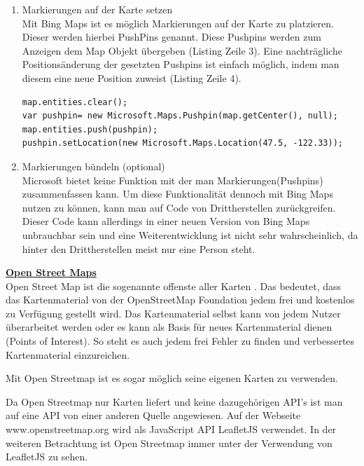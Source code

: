 \begin{enumerate}
\item Markierungen auf der Karte setzen\\

Mit Bing Maps ist es möglich Markierungen auf der Karte zu platzieren. Dieser werden hierbei PushPins genannt. Diese Pushpins werden zum Anzeigen dem Map Objekt übergeben (Listing Zeile 3). Eine nachträgliche Positionsänderung der gesetzten Pushpins ist einfach möglich, indem man diesem eine neue Position zuweist (Listing Zeile 4).

\begin{lstlisting}
map.entities.clear(); 
var pushpin= new Microsoft.Maps.Pushpin(map.getCenter(), null); 
map.entities.push(pushpin); 
pushpin.setLocation(new Microsoft.Maps.Location(47.5, -122.33)); 
\end{lstlisting}\cite[Pushpins7]{bingmaps}

\item Markierungen bündeln (optional)\\
Microsoft bietet keine Funktion mit der man Markierungen(Pushpins) zusammenfassen kann. Um diese Funktionalität dennoch mit Bing Maps nutzen zu können, kann man auf Code von Drittherstellen zurückgreifen. Dieser Code kann allerdings in einer neuen Version von Bing Maps unbrauchbar sein und eine Weiterentwicklung ist nicht sehr wahrscheinlich, da hinter den Drittherstellen meist nur eine Person steht. \cite[S. 92]{gruber2015}
\end{enumerate}








\textbf{\underline{Open Street Maps}}\\
Open Street Map ist die sogenannte \glqq offenste aller Karten \grqq \cite[S.92]{gruber2015}. Das bedeutet, dass das Kartenmaterial von der OpenStreetMap Foundation jedem frei und kostenlos zu Verfügung gestellt wird. Das Kartenmaterial selbst kann von jedem Nutzer überarbeitet werden oder es kann als Basis für neues Kartenmaterial dienen (Points of Interest). So steht es auch jedem frei Fehler zu finden und verbessertes Kartenmaterial einzureichen.

Mit Open Streetmap ist es sogar möglich seine eigenen Karten zu verwenden.

Da Open Streetmap nur Karten liefert und keine dazugehörigen API's ist man auf eine API von einer anderen Quelle angewiesen. Auf der Webseite www.openstreetmap.org wird als JavaScript API LeafletJS verwendet. 
In der weiteren Betrachtung ist Open Streetmap immer unter der Verwendung von LeafletJS zu sehen.


